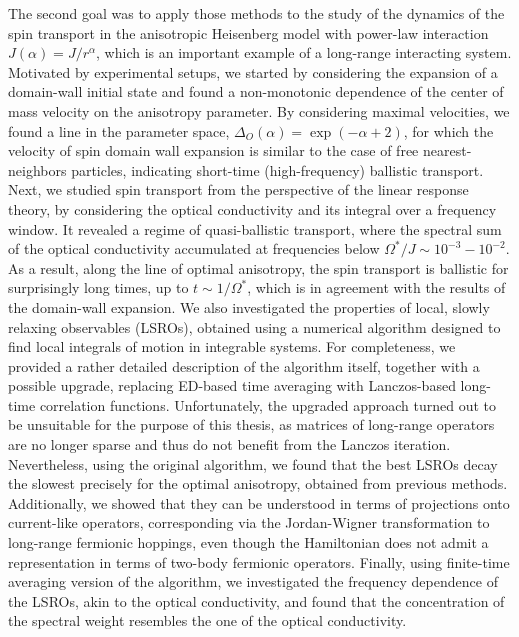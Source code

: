 The second goal was to apply those methods to the study of the dynamics of the spin transport in the anisotropic
Heisenberg model with power-law interaction \(J(\alpha) = J/r^{\alpha}\), which is an important example of a
long-range interacting system. Motivated by experimental setups, we started by considering the
expansion of a domain-wall initial state and found a non-monotonic dependence of the
center of mass velocity on the anisotropy parameter. By considering maximal velocities,
we found a line in the parameter space, \(\Delta_O(\alpha) = \exp(-\alpha + 2)\),
for which the velocity of spin domain wall expansion is similar to the case of free
nearest-neighbors particles, indicating short-time (high-frequency) ballistic transport. 
Next, we studied spin transport from the perspective of the linear response theory,
by considering the optical conductivity and its integral over a frequency window. 
It revealed a regime of quasi-ballistic transport, where the spectral sum
of the optical conductivity accumulated at frequencies below \(\Omega^{\ast}/J \sim
10^{-3}-10^{-2}\). As a result, along the line of optimal anisotropy, the spin
transport is ballistic for surprisingly long times, up to \(t \sim 1/\Omega^{\ast}\),
which is in agreement with the results of the domain-wall expansion. 
We also investigated the properties of local, slowly relaxing observables
(LSROs), obtained using a numerical algorithm designed to find local integrals of
motion in integrable systems. For completeness, we provided a rather detailed
description of the algorithm itself, together with a possible upgrade, replacing
ED-based time averaging with Lanczos-based long-time correlation functions.
Unfortunately, the upgraded approach turned out to be unsuitable for the purpose of
this thesis, as matrices of long-range operators are no longer sparse and thus do not
benefit from the Lanczos iteration. Nevertheless, using the original algorithm, we
found that the best LSROs decay the slowest precisely for the optimal anisotropy, obtained from
previous methods. Additionally, we showed that they can be understood in terms of projections onto
current-like operators, corresponding via the Jordan-Wigner transformation to long-range fermionic hoppings,
even though the Hamiltonian does not admit a representation in terms of two-body fermionic operators.
Finally, using finite-time averaging version of the algorithm, we investigated the frequency dependence
of the LSROs, akin to the optical conductivity, and found that the concentration of the spectral weight
resembles the one of the optical conductivity.

